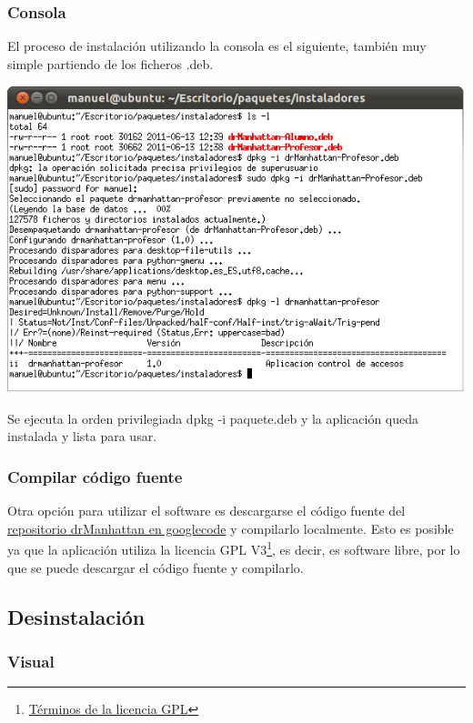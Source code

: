 \documentclass[11pt]{article}
\begin{document}
\subsubsection{Consola}

El proceso de instalación utilizando la consola es el siguiente, también muy simple partiendo de los ficheros .deb.


\begin{center}

    \includegraphics[width=.90\linewidth]{imagenes/instalacionConsola}

\end{center}

Se ejecuta la orden privilegiada dpkg -i paquete.deb y la aplicación queda instalada y lista para usar.

\subsubsection{Compilar código fuente}

Otra opción para utilizar el software es descargarse el código fuente del \href{http://code.google.com/p/drmanhattan/}{repositorio drManhattan en googlecode} y compilarlo localmente. Esto es posible ya que la aplicación utiliza la licencia GPL V3\footnote{\href{http://www.gnu.org/licenses/gpl.html}{Términos de la licencia GPL}}, es decir, es software libre, por lo que se puede descargar el código fuente y compilarlo.



\subsection{Desinstalación}

\subsubsection{Visual}
\end{document}
